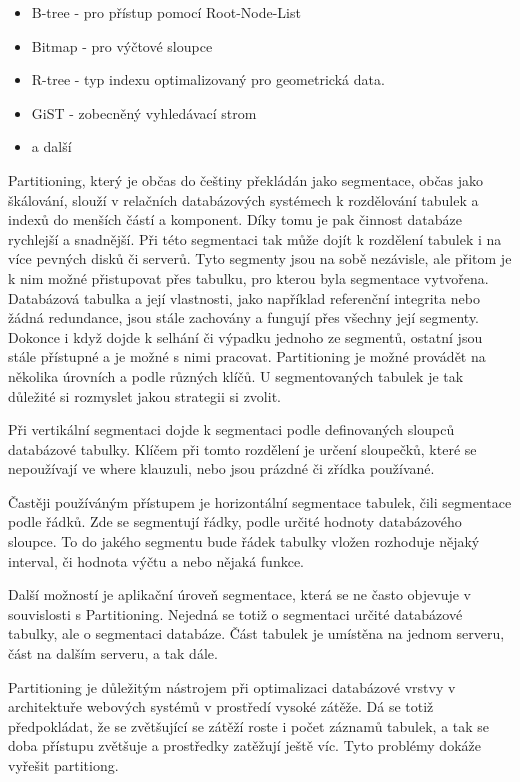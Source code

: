 \documentclass[12pt]{article}
\begin{document}
\begin{itemize}
\item B-tree - pro přístup pomocí Root-Node-List
\item Bitmap - pro výčtové sloupce
\item R-tree - typ indexu optimalizovaný pro geometrická data.
\item GiST - zobecněný vyhledávací strom
\item a další
\end{itemize}


Partitioning, který je občas do češtiny překládán jako segmentace, občas jako škálování, slouží v relačních databázových systémech k rozdělování tabulek a indexů do menších částí a komponent. Díky tomu je pak činnost databáze rychlejší a snadnější. Při této segmentaci tak může dojít k rozdělení tabulek i na více pevných disků či serverů. Tyto segmenty jsou na sobě nezávisle, ale přitom je k nim možné přistupovat přes tabulku, pro kterou byla segmentace vytvořena. Databázová tabulka a její vlastnosti, jako například referenční integrita nebo žádná redundance, jsou stále zachovány a fungují přes všechny její segmenty. Dokonce i když dojde k selhání či výpadku jednoho ze segmentů, ostatní jsou stále přístupné a je možné s nimi pracovat. Partitioning je možné provádět na několika úrovních a podle různých klíčů. U segmentovaných tabulek je tak důležité si rozmyslet jakou strategii si zvolit. 

Při vertikální segmentaci dojde k segmentaci podle definovaných sloupců databázové tabulky. Klíčem při tomto rozdělení je určení sloupečků, které se nepoužívají ve where klauzuli, nebo jsou prázdné či zřídka používané. 

Častěji používáným přístupem je horizontální segmentace tabulek, čili segmentace podle řádků. Zde se segmentují řádky, podle určité hodnoty databázového sloupce. To do jakého segmentu bude řádek tabulky vložen rozhoduje nějaký interval, či hodnota výčtu a nebo nějaká funkce.

Další možností je aplikační úroveň segmentace, která se ne často objevuje v souvislosti s Partitioning. Nejedná se totiž o segmentaci určité databázové tabulky, ale o segmentaci databáze. Část tabulek je umístěna na jednom serveru, část na dalším serveru, a tak dále.

Partitioning je důležitým nástrojem při optimalizaci databázové vrstvy v architektuře webových systémů v prostředí vysoké zátěže. Dá se totiž předpokládat, že se zvětšující se zátěží roste i počet záznamů tabulek, a tak se doba přístupu zvětšuje a prostředky zatěžují ještě víc. Tyto problémy dokáže vyřešit partitiong.
\cite{partitioning-db}
\end{document}
